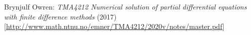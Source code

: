 \documentclass{article}
\begin{document}


\clearpage


\clearpage


\clearpage


\clearpage


\clearpage


\clearpage
\begin{thebibliography}{99}
Brynjulf Owren:
\textit{TMA4212 Numerical solution of partial differential equations with finite difference methods}
(2017)
[\url{http://www.math.ntnu.no/emner/TMA4212/2020v/notes/master.pdf}]

\end{thebibliography}
\end{document}
